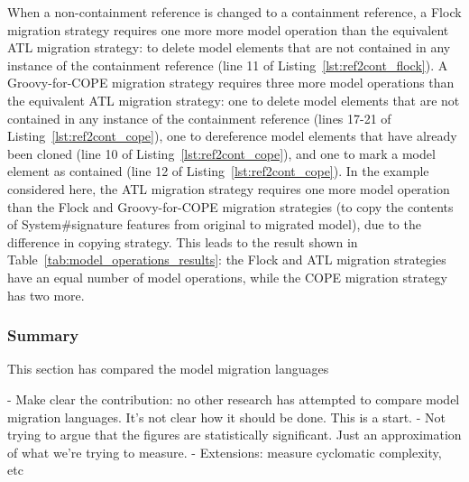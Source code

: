 When a non-containment reference is changed to a containment reference, a Flock migration strategy requires one more more model operation than the equivalent ATL migration strategy: to delete model elements that are not contained in any instance of the containment reference (line 11 of Listing~\ref{lst:ref2cont_flock}). A Groovy-for-COPE migration strategy requires three more model operations than the equivalent ATL migration strategy: one to delete model elements that are not contained in any instance of the containment reference (lines 17-21 of Listing~\ref{lst:ref2cont_cope}), one to dereference model elements that have already been cloned (line 10 of Listing~\ref{lst:ref2cont_cope}), and one to mark a model element as contained (line 12 of Listing~\ref{lst:ref2cont_cope}).  In the example considered here, the ATL migration strategy requires one more model operation than the Flock and Groovy-for-COPE migration strategies (to copy the contents of System\#signature features from original to migrated model), due to the difference in copying strategy. This leads to the result shown in Table~\ref{tab:model_operations_results}: the Flock and ATL migration strategies have an equal number of model operations, while the COPE migration strategy has two more.


\subsubsection{Summary}
This section has compared the model migration languages

- Make clear the contribution: no other research has attempted to compare model migration languages. It's not clear how it should be done. This is a start. 
- Not trying to argue that the figures are statistically significant. Just an approximation of what we're trying to measure.
- Extensions: measure cyclomatic complexity, etc
